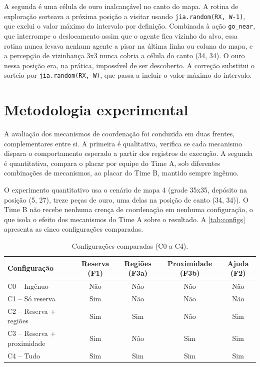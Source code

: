\documentclass{article}
\begin{document}
A segunda é uma célula de ouro inalcançável no canto do mapa. A rotina de
exploração sorteava a próxima posição a visitar usando
\texttt{jia.random(RX, W-1)}, que exclui o valor máximo do intervalo por
definição. Combinada à ação \texttt{go\_near}, que interrompe o deslocamento
assim que o agente fica vizinho do alvo, essa rotina nunca levava nenhum
agente a pisar na última linha ou coluna do mapa, e a percepção de vizinhança
3x3 nunca cobria a célula do canto (34, 34). O ouro nessa posição era, na
prática, impossível de ser descoberto. A correção substitui o sorteio por
\texttt{jia.random(RX, W)}, que passa a incluir o valor máximo do intervalo.

\section{Metodologia experimental}
\label{sec:metodologia}

A avaliação dos mecanismos de coordenação foi conduzida em duas frentes,
complementares entre si. A primeira é qualitativa, verifica se cada
mecanismo dispara o comportamento esperado a partir dos registros de
execução. A segunda é quantitativa, compara o placar por equipe do Time A,
sob diferentes combinações de mecanismos, ao placar do Time B, mantido
sempre ingênuo.

O experimento quantitativo usa o cenário de mapa 4 (grade 35x35, depósito na
posição (5, 27), treze peças de ouro, uma delas na posição de canto (34,
34)). O Time B não recebe nenhuma crença de coordenação em nenhuma
configuração, o que isola o efeito dos mecanismos do Time A sobre o
resultado. A \autoref{tab:configs} apresenta as cinco configurações
comparadas.

\begin{table}[H]
    \centering
    \caption{Configurações comparadas (C0 a C4).}
    \label{tab:configs}
    \begin{tabular}{lcccc}
        \hline
        \textbf{Configuração} & \textbf{Reserva (F1)} & \textbf{Regiões (F3a)} & \textbf{Proximidade (F3b)} & \textbf{Ajuda (F2)} \\
        \hline
        C0 -- Ingênuo               & Não & Não & Não & Não \\
        C1 -- Só reserva            & Sim & Não & Não & Não \\
        C2 -- Reserva + regiões     & Sim & Sim & Não & Sim \\
        C3 -- Reserva + proximidade & Sim & Não & Sim & Sim \\
        C4 -- Tudo                  & Sim & Sim & Sim & Sim \\
        \hline
    \end{tabular}
\end{table}
\end{document}
